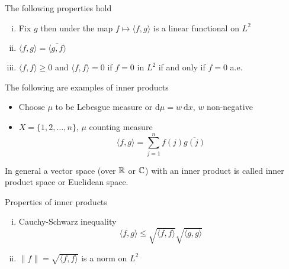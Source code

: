 \begin{definition}
  The following properties hold
  \begin{enumerate}[(i)]
    \item Fix $g$ then under the map $f \mapsto \langle f, g\rangle$ is a linear functional on $L^2$
    \item $\langle f, g\rangle = \overline{\langle g, f\rangle}$
    \item $\langle f, f\rangle \ge 0$ and $\langle f, f\rangle = 0$ if $f = 0$ in $L^2$ if and only if $f = 0$ a.e.
  \end{enumerate}
\end{definition}

\begin{example}
  The following are examples of inner products
  \begin{itemize}
    \item 
  Choose $\mu$ to be Lebesgue measure or $\mathrm{d}\mu = w \ \mathrm{d}x$, $w$ non-negative 
  \item $X = \{1, 2, \dotsc, n\}$, $\mu$ counting measure
  \[\langle f, g\rangle = \sum_{j=1}^n f(j)\overline{g(j)}\]
  \end{itemize}
  In general a vector space (over $\mathbb R$ or $\mathbb C$) with an inner product is called inner product space or 
  Euclidean space.
\end{example}

\begin{lemma}
  Properties of inner products 
  \begin{enumerate}[(i)]
    \item Cauchy-Schwarz inequality
    \[\langle f, g\rangle \le \sqrt{\langle f, f\rangle} \sqrt{\langle g, g\rangle}\]
    \item $\|f\| = \sqrt{\langle f, f\rangle}$ is a norm on $L^2$
  \end{enumerate}
\end{lemma}

